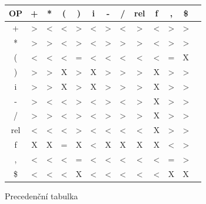 \documentclass[11pt, a4paper]{article}
\begin{document}
\renewcommand{\arraystretch}{2}
\scriptsize
\centering
\begin{tabular}{ c | c c c c c c c c c c c c } 
OP  & + & * & ( & ) & i & - & / & rel & f & , & \$ \\ \hline
+ & \textgreater & \textless & \textless &  \textgreater & \textless & \textgreater & \textless 
  & \textgreater & \textless  &  \textgreater &  \textgreater   \\ \hline
* & \textgreater & \textgreater & \textless & \textgreater & \textless & \textgreater   
  & \textgreater  & \textgreater  & \textless & \textgreater & \textgreater \\ \hline
( & \textless & \textless & \textless & = & \textless & \textless & \textless & \textless 
   & \textless & = & X \\ \hline
) & \textgreater & \textgreater & X & \textgreater & X & \textgreater & \textgreater 
  & \textgreater  & X & \textgreater & \textgreater \\ \hline
i & \textgreater & \textgreater & X & \textgreater & X & \textgreater & \textgreater 
  & \textgreater & X & \textgreater & \textgreater \\ \hline
- & \textgreater & \textless & \textless & \textgreater & \textless & \textgreater & \textless 
  & \textgreater & X & \textgreater & \textgreater \\ \hline
/ & \textgreater & \textgreater & \textless &  \textgreater & \textless & \textgreater 
  & \textgreater & \textgreater & X & \textgreater & \textgreater \\ \hline
rel & \textless & \textless & \textless & \textgreater & \textless & \textless & \textless 
    &  \textless & X & \textgreater & \textgreater \\ \hline
f   & X & X & = & X & \textless & X & X & X & X & \textless  & \textgreater \\ \hline
, & \textless & \textless & \textless & = & \textless & \textless & \textless & \textless 
  & \textless & = & \textgreater \\ \hline
\$ & \textless & \textless & \textless & X & \textless & \textless & \textless & \textless 
   & \textless & X & X 
\end{tabular}
\renewcommand{\arraystretch}{1}


Precedenční tabulka
\end{document}
